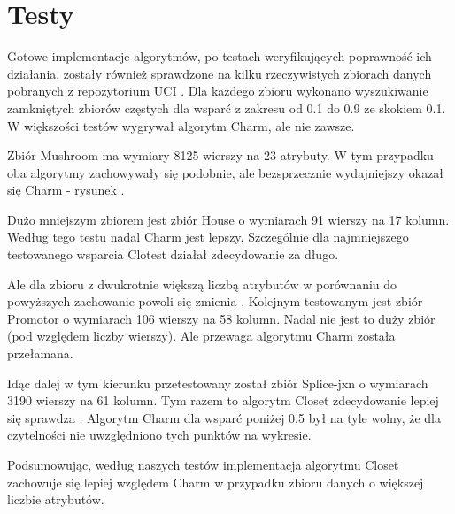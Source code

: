 \section{Testy}

Gotowe implementacje algorytmów, po testach weryfikujących poprawność ich działania, zostały również sprawdzone na kilku rzeczywistych zbiorach danych pobranych z repozytorium UCI \cite{UCI}.
Dla każdego zbioru wykonano wyszukiwanie zamkniętych zbiorów częstych dla wsparć z zakresu od 0.1 do 0.9 ze skokiem 0.1.
W większości testów wygrywał algorytm Charm, ale nie zawsze.

Zbiór Mushroom ma wymiary 8125 wierszy na 23 atrybuty. 
W tym przypadku oba algorytmy zachowywały się podobnie, ale bezsprzecznie wydajniejszy okazał się Charm - rysunek \cite{plot:mushroom}.

Dużo mniejszym zbiorem jest zbiór House o wymiarach 91 wierszy na 17 kolumn.
Według tego testu \cite{plot:house} nadal Charm jest lepszy. 
Szczególnie dla najmniejszego testowanego wsparcia Clotest działał zdecydowanie za długo.

Ale dla zbioru z dwukrotnie większą liczbą atrybutów w porównaniu do powyższych zachowanie powoli się zmienia \cite{plot:promotor}. Kolejnym testowanym jest zbiór Promotor o wymiarach 106 wierszy na 58 kolumn.
Nadal nie jest to duży zbiór (pod względem liczby wierszy).
Ale przewaga algorytmu Charm została przełamana.

Idąc dalej w tym kierunku przetestowany został zbiór Splice-jxn o wymiarach 3190 wierszy na 61 kolumn.
Tym razem to algorytm Closet zdecydowanie lepiej się sprawdza \cite{plot:slice}.
Algorytm Charm dla wsparć poniżej 0.5 był na tyle wolny, że dla czytelności nie uwzględniono tych punktów na wykresie.

Podsumowując, według naszych testów implementacja algorytmu Closet zachowuje się lepiej względem Charm w przypadku zbioru danych o większej liczbie atrybutów.

